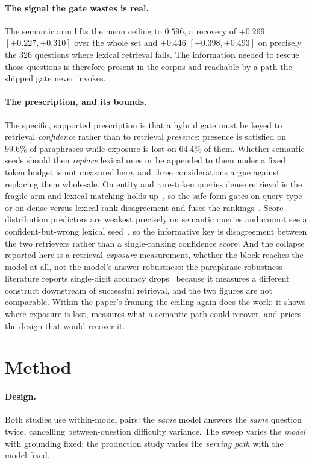 \documentclass[10pt,twocolumn]{article}
\begin{document}
\paragraph{The signal the gate wastes is real.} The semantic arm lifts the mean ceiling to $0.596$,
a recovery of $+0.269$ $[+0.227,+0.310]$ over the whole set and $\mathbf{+0.446}$
$[+0.398,+0.493]$ on precisely the 326 questions where lexical retrieval fails. The information
needed to rescue those questions is therefore present in the corpus and reachable by a path the
shipped gate never invokes.

\paragraph{The prescription, and its bounds.} The specific, supported prescription is that a hybrid
gate must be keyed to retrieval \emph{confidence} rather than to retrieval \emph{presence}: presence
is satisfied on $99.6\%$ of paraphrases while exposure is lost on $64.4\%$ of them. Whether semantic
seeds should then \emph{replace} lexical ones or be appended to them under a fixed token budget is
not measured here, and three considerations argue against replacing them wholesale. On entity and
rare-token queries dense retrieval is the fragile arm and lexical matching holds
up~\cite{entityquestions2021}, so the safe form gates on query type or on dense-versus-lexical rank
disagreement and fuses the rankings~\cite{rrf2009}. Score-distribution predictors are weakest
precisely on semantic queries and cannot see a confident-but-wrong lexical seed~\cite{qppneural2023},
so the informative key is disagreement between the two retrievers rather than a single-ranking
confidence score. And the collapse reported here is a retrieval-\emph{exposure} measurement, whether
the block reaches the model at all, not the model's answer robustness: the paraphrase-robustness
literature reports single-digit accuracy drops~\cite{benchrobust2025} because it measures a different
construct downstream of successful retrieval, and the two figures are not comparable. Within the
paper's framing the ceiling again does the work: it shows where exposure is lost, measures what a
semantic path could recover, and prices the design that would recover it.

\section{Method}\label{sec:method}
\paragraph{Design.} Both studies use within-model pairs: the \emph{same} model answers the \emph{same} question twice, cancelling between-question difficulty variance. The sweep varies the \emph{model} with grounding fixed; the production study varies the \emph{serving path} with the model fixed.
\end{document}

